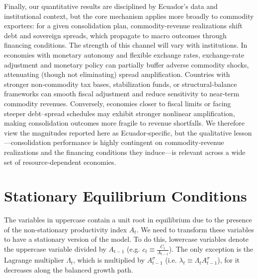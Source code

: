 \documentclass[12pt]{article}
\begin{document}
Finally, our quantitative results are disciplined by Ecuador’s data and institutional context, but the core mechanism applies more broadly to commodity exporters: for a given consolidation plan, commodity‑revenue realizations shift debt and sovereign spreads, which propagate to macro outcomes through financing conditions. The strength of this channel will vary with institutions. In economies with monetary autonomy and flexible exchange rates, exchange‑rate adjustment and monetary policy can partially buffer adverse commodity shocks, attenuating (though not eliminating) spread amplification. Countries with stronger non‑commodity tax bases, stabilization funds, or structural‑balance frameworks can smooth fiscal adjustment and reduce sensitivity to near‑term commodity revenues. Conversely, economies closer to fiscal limits or facing steeper debt–spread schedules may exhibit stronger nonlinear amplification, making consolidation outcomes more fragile to revenue shortfalls. We therefore view the magnitudes reported here as Ecuador‑specific, but the qualitative lesson—consolidation performance is highly contingent on commodity‑revenue realizations and the financing conditions they induce—is relevant across a wide set of resource‑dependent economies.

\clearpage
\newpage

\singlespacing


\clearpage
\appendix
\appendixpage
{}

\section{Stationary Equilibrium Conditions}
\label{Appendix:equations}


\renewcommand{\theequation}{A.\arabic{equation}} \setcounter{equation}{0}

The variables in uppercase contain a unit root in equilibrium due to the presence of the non-stationary productivity index $A_{t}$. We need to transform these variables to have a stationary version of the model. To do this, lowercase variables denote the uppercase variable divided by $A_{t-1}$ (e.g. $%
c_{t}\equiv \frac{C_{t}}{A_{t-1}}$). The only exception is the Lagrange multiplier $\Lambda _{t}$, which is multiplied by $A_{t-1}^{\sigma }$ (i.e. $\lambda _{t}\equiv \Lambda _{t}A_{t-1}^{\sigma }$), for it decreases along
the balanced growth path.
\end{document}
